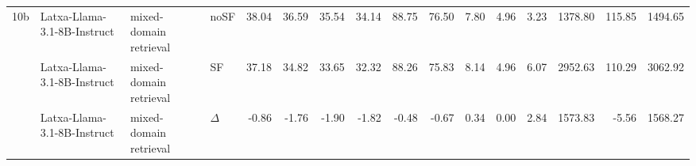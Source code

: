 \begin{landscape}
\begin{footnotesize}
\begin{longtable}{l l l l r r r r r r r r r r r r}
10b & Latxa-Llama-3.1-8B-Instruct & mixed-domain retrieval & noSF & 38.04 & 36.59 & 35.54 & 34.14 & 88.75 & 76.50 & 7.80 & 4.96 & 3.23 & 1378.80 & 115.85 & 1494.65 \\
 & Latxa-Llama-3.1-8B-Instruct & mixed-domain retrieval & SF & 37.18 & 34.82 & 33.65 & 32.32 & 88.26 & 75.83 & 8.14 & 4.96 & 6.07 & 2952.63 & 110.29 & 3062.92 \\
 & Latxa-Llama-3.1-8B-Instruct & mixed-domain retrieval & $\Delta$ & -0.86 & -1.76 & -1.90 & -1.82 & -0.48 & -0.67 & 0.34 & 0.00 & 2.84 & 1573.83 & -5.56 & 1568.27 \\
\end{longtable}
\end{footnotesize}
\end{landscape}

